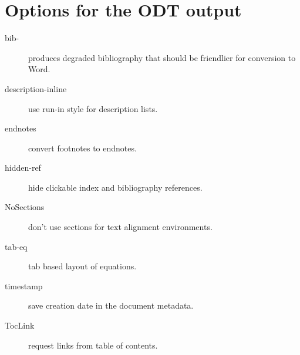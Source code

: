 \section{Options for the ODT output}

\begin{description}
  \item[bib-] produces degraded bibliography that should be friendlier for conversion to Word.
  \item[description-inline] use run-in style for description lists.
  \item[endnotes] convert footnotes to endnotes.
  \item[hidden-ref] hide clickable index and bibliography references.
  \item[NoSections] don't use sections for text alignment environments.
  \item[tab-eq] tab based layout of equations.
  \item[timestamp] save creation date in the document metadata.
  \item[TocLink] request links from table of contents.
\end{description}
\endgroup
